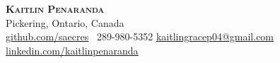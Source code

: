 \begin{center}
    \textbf{\Huge \scshape Kaitlin Penaranda} \\
    \vspace{2pt}
    Pickering, Ontario, Canada \\ \vspace{2pt}
    \href{https://github.com/Saecres}{ \underline{github.com/saecres}}
     \ \small 289-980-5352 \quad
    \href{mailto:kaitlingracep04@gmail.com}{ \underline{kaitlingracep04@gmail.com}} \quad
    \href{https://www.linkedin.com/in/kaitlinpenaranda/}{ \underline{linkedin.com/kaitlinpenaranda}} \quad

\end{center}